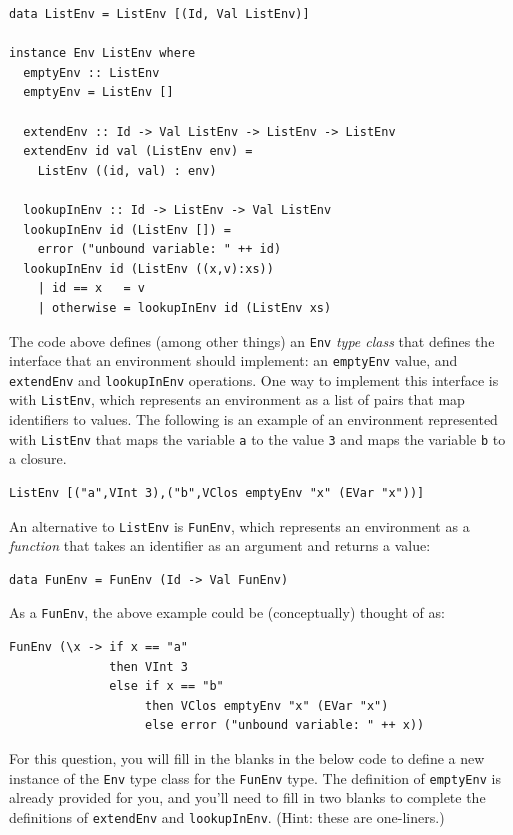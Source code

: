 \documentclass[addpoints]{exam}
\begin{document}
\begin{questions}
\begin{verbatim}
data ListEnv = ListEnv [(Id, Val ListEnv)]

instance Env ListEnv where
  emptyEnv :: ListEnv
  emptyEnv = ListEnv []

  extendEnv :: Id -> Val ListEnv -> ListEnv -> ListEnv
  extendEnv id val (ListEnv env) =
    ListEnv ((id, val) : env)

  lookupInEnv :: Id -> ListEnv -> Val ListEnv
  lookupInEnv id (ListEnv []) =
    error ("unbound variable: " ++ id)
  lookupInEnv id (ListEnv ((x,v):xs))
    | id == x   = v
    | otherwise = lookupInEnv id (ListEnv xs)
\end{verbatim}

\question The code above defines (among other things) an \verb|Env| \emph{type class} that defines the interface that an environment should implement: an \verb|emptyEnv| value, and \verb|extendEnv| and \verb|lookupInEnv| operations.  One way to implement this interface is with \verb|ListEnv|, which represents an environment as a list of pairs that map identifiers to values.  The following is an example of an environment represented with \verb|ListEnv| that maps the variable \verb|a| to the value \verb|3| and maps the variable \verb|b| to a closure.

\begin{verbatim}
ListEnv [("a",VInt 3),("b",VClos emptyEnv "x" (EVar "x"))]
\end{verbatim}

An alternative to \verb|ListEnv| is \verb|FunEnv|, which represents an environment as a \emph{function} that takes an identifier as an argument and returns a value:

\begin{verbatim}
data FunEnv = FunEnv (Id -> Val FunEnv)
\end{verbatim}

As a \verb|FunEnv|, the above example could be (conceptually) thought of as:
\begin{verbatim}
FunEnv (\x -> if x == "a"
              then VInt 3
              else if x == "b"
                   then VClos emptyEnv "x" (EVar "x")
                   else error ("unbound variable: " ++ x))
\end{verbatim}

For this question, you will fill in the blanks in the below code to define a new instance of the \verb|Env| type class for the \verb|FunEnv| type.  The definition of \verb|emptyEnv| is already provided for you, and you'll need to fill in two blanks to complete the definitions of \verb|extendEnv| and \verb|lookupInEnv|. (Hint: these are one-liners.)


\end{questions}
\end{document}
